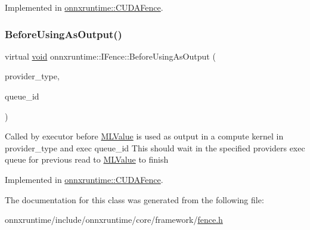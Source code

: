 Implemented in \mbox{\hyperlink{classonnxruntime_1_1CUDAFence_ae696393f88e06ad9e8c8576f6f306c32}{onnxruntime\+::\+C\+U\+D\+A\+Fence}}.

\mbox{\label{classonnxruntime_1_1IFence_a0d93955cc57accb1a5e81b820fc9a7d5}} 
\subsubsection{\texorpdfstring{Before\+Using\+As\+Output()}{BeforeUsingAsOutput()}}
{\footnotesize\ttfamily virtual \mbox{\hyperlink{mlasi_8h_a88f941d423cb2a819b70a1358982b1a6}{void}} onnxruntime\+::\+I\+Fence\+::\+Before\+Using\+As\+Output (\begin{DoxyParamCaption}\item[{\mbox{\hyperlink{namespaceonnxruntime_a863e2227cbf32aab76aad35fdadff4bb}{onnxruntime\+::\+Provider\+Type}}}]{provider\+\_\+type,  }\item[{int}]{queue\+\_\+id }\end{DoxyParamCaption})\hspace{0.3cm}{\ttfamily [pure virtual]}}

Called by executor before \mbox{\hyperlink{classonnxruntime_1_1MLValue}{M\+L\+Value}} is used as output in a compute kernel in provider\+\_\+type and exec queue\+\_\+id This should wait in the specified provider\textquotesingle{}s exec queue for previous read to \mbox{\hyperlink{classonnxruntime_1_1MLValue}{M\+L\+Value}} to finish 

Implemented in \mbox{\hyperlink{classonnxruntime_1_1CUDAFence_a93950e06048ab9d52523beaa5b89d481}{onnxruntime\+::\+C\+U\+D\+A\+Fence}}.



The documentation for this class was generated from the following file\+:\begin{DoxyCompactItemize}
\item 
onnxruntime/include/onnxruntime/core/framework/\mbox{\hyperlink{fence_8h}{fence.\+h}}\end{DoxyCompactItemize}
